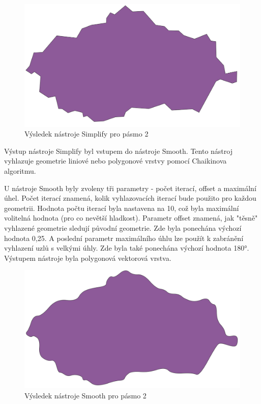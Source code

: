 \begin{figure}[H] \centering
    \includegraphics[width=400pt]{./pictures/simplify.png}
    \caption[Výsledek nástroje Simplify pro pásmo 2]{Výsledek nástroje Simplify pro pásmo 2}
	\label{fig:simplify}                                
\end{figure}

Výstup nástroje Simplify byl vstupem do nástroje Smooth. Tento nástroj vyhlazuje geometrie
liniové nebo polygonové vrstvy pomocí Chaikinova algoritmu.

U nástroje Smooth byly zvoleny tři parametry - počet iterací, offset a maximální úhel.
Počet iterací znamená, kolik vyhlazovacích iterací bude použito pro každou geometrii.
Hodnota počtu iterací byla nastavena na 10, což byla maximální volitelná hodnota (pro co nevětší hladkost).
Parametr offset znamená, jak "těsně" vyhlazené geometrie sledují původní geometrie.
Zde byla ponechána výchozí hodnota 0,25. A poslední parametr maximálního úhlu lze použít
k zabránění vyhlazení uzlů s velkými úhly. Zde byla také ponechána výchozí hodnota 180°.
Výstupem nástroje byla polygonová vektorová vrstva.

\begin{figure}[H] \centering
    \includegraphics[width=400pt]{./pictures/smooth.png}
    \caption[Výsledek nástroje Smooth pro pásmo 2]{Výsledek nástroje Smooth pro pásmo 2}
	\label{fig:smooth}                                
\end{figure}

